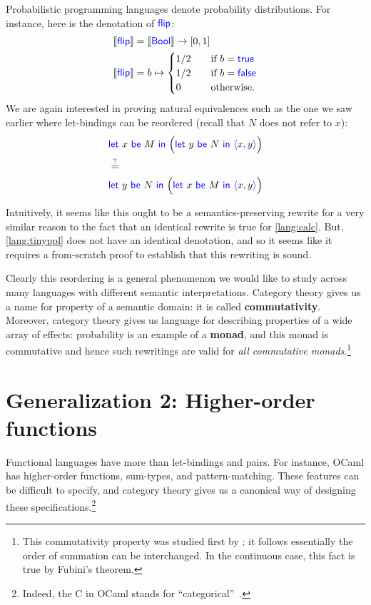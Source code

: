 Probabilistic programming languages denote probability distributions. For instance,
here is the denotation of $\mathsf{{\color{blue}flip}}{}$:
\begin{align*}
  \left\llbracket \mathsf{{\color{blue}flip}}{} \right\rrbracket &= \left\llbracket \mathsf{{\color{blue}Bool}} \right\rrbracket \to [0,1] \\
  \left\llbracket \mathsf{{\color{blue}flip}}{} \right\rrbracket &= b \mapsto
  \begin{cases}
    1/2 \quad& \text{if }b=\mathsf{{\color{blue}true}}\\
    1/2 \quad& \text{if }b=\mathsf{{\color{blue}false}}\\
    0 \quad& \text{otherwise.}
  \end{cases}
\end{align*}
We are again interested in proving natural equivalences such as the one 
we saw earlier where let-bindings can be reordered (recall that 
$N$ does not refer to $x$):
\begin{align*}
  &\pllet{x}{M}{\Big( \pllet{y}{N}{\plpair{x}{y}} \Big)}\\
  &\stackrel{?}{=}\\
  &\pllet{y}{N}{\Big( \pllet{x}{M}{\plpair{x}{y}} \Big)}
\end{align*}

Intuitively, it seems like this ought to be a semantics-preserving rewrite for a
very similar reason to the fact that an identical rewrite is true for
\ref{lang:calc}. But, \ref{lang:tinyppl} does not have an identical denotation,
and so it seems like it requires a from-scratch proof to establish that 
this rewriting is sound.

Clearly this reordering is a general phenomenon we would like to study across 
many languages with different semantic interpretations.  Category theory gives
us a name for property of a semantic domain: it is called 
\textbf{commutativity}.  Moreover, category theory gives us language for
describing properties of a wide array of effects: probability is an example of a
\textbf{monad}, and this monad is commutative and hence such rewritings are
valid for \emph{all commutative monads}.\footnote{This commutativity property
was studied first by \citep{staton2017commutative}; it follows essentially the
order of summation can be interchanged. In the continuous case, this fact is
true by Fubini's theorem.}

\section{Generalization 2: Higher-order functions}
Functional languages have more than let-bindings and pairs. For instance, 
OCaml has higher-order functions, sum-types, and pattern-matching. These 
features can be difficult to specify, and category theory gives us a canonical 
way of designing these specifications.\footnote{Indeed, the C in OCaml stands for ``categorical''~\citep{cousineau1987categorical}.}

